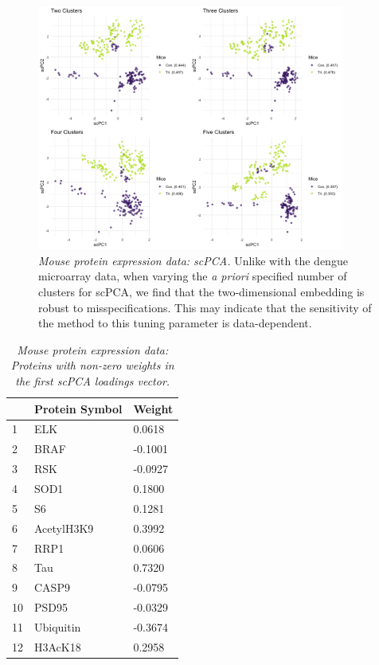 \begin{figure}[!htbp]
    \centering
    \includegraphics[width=0.9\textwidth]{figures/mice_scpca_centers.png}
    \caption{
    \textit{Mouse protein expression data: scPCA.}
    Unlike with the dengue microarray data, when varying the \textit{a priori} specified number of clusters for scPCA, we find that the two-dimensional embedding is robust to misspecifications. This may indicate that the sensitivity of the method to this tuning parameter is data-dependent.
    }
    \label{fig:mice_scpca_centers}
\end{figure}

\begin{longtable}{| l | p{4cm} | l |}
  \caption{{\em Mouse protein expression data: Proteins with non-zero weights in the first scPCA loadings vector.}} \label{tab:mouse_prot_1} \\
  \hline
   & Protein Symbol & Weight \\ 
 \hline
  1 & ELK & 0.0618 \\ 
  2 & BRAF & -0.1001 \\ 
  3 & RSK & -0.0927 \\ 
  4 & SOD1 & 0.1800 \\ 
  5 & S6 & 0.1281 \\ 
  6 & AcetylH3K9 & 0.3992 \\ 
  7 & RRP1 & 0.0606 \\ 
  8 & Tau & 0.7320 \\ 
  9 & CASP9 & -0.0795 \\ 
  10 & PSD95 & -0.0329 \\ 
  11 & Ubiquitin & -0.3674 \\ 
  12 & H3AcK18 & 0.2958 \\ 
 \hline
 \end{longtable}


